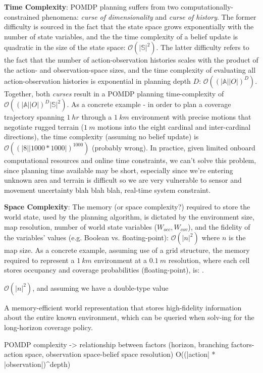 \documentclass[letterpaper]{article} %
\newcommand{\ph}[1]{{\textbf{#1}:}} %
\begin{document}
\ph{Time Complexity}
POMDP planning suffers from two computationally-constrained phenomena: \textit{curse of dimensionality} and \textit{curse of history}. The former difficulty is sourced in the fact that the state space grows exponentially with the number of state variables, and the the time complexity of a belief update is quadratic in the size of the state space: $\mathcal{O}(|\mathbb{S}|^2)$. The latter difficulty refers to the fact that the number of action-observation histories scales with the product of the action- and observation-space sizes, and the time complexity of evaluating all action-observation histories is exponential in planning depth $D$: $\mathcal{O}((|\mathbb{A}||O|)^D)$. Together, both \textit{curses} result in a POMDP planning time-complexity of $\mathcal{O}((|\mathbb{A}||O|)^D|\mathbb{S}|^2)$. As a concrete example - in order to plan a coverage trajectory spanning $1~hr$ through a $1~km$ environment with precise motions that negotiate rugged terrain ($1~m$ motions into the eight cardinal and inter-cardinal directions), the time complexity (assuming no belief update) is $\mathcal{O}((|8||1000*1000|)^{1000})$ (probably wrong). In practice, given limited onboard computational resources and online time constraints, we can't solve this problem, since planning time available may be short, especially since we're entering unknown area and terrain is difficult so we are very vulnerable to sensor and movement uncertainty blah blah blah, real-time system constraint.

\ph{Space Complexity}
The memory (or space complexity?) required to store the world state, used by the planning algorithm, is dictated by the environment size, map resolution, number of world state variables ($W_{occ}, W_{cov}$), and the fidelity of the variables' values (e.g. Boolean vs. floating-point): $\mathcal{O}(|n|^2)$ where $n$ is the map size. As a concrete example, assuming use of a grid structure, the memory required to represent a $1~km$ environment at a $0.1~m$ resolution, where each cell stores occupancy and coverage probabilities (floating-point), is: . 






$\mathcal{O}(|n|^2)$, and assuming we have a double-type value

 A memory-efficient world representation that stores high-fidelity information about the entire known environment, which can be queried when solv-ing for the long-horizon coverage policy.


POMDP complexity -> relationship between factors (horizon, branching factors-action space, observation space-belief space resolution)
O((|action| * |observation|)^depth)
\end{document}

